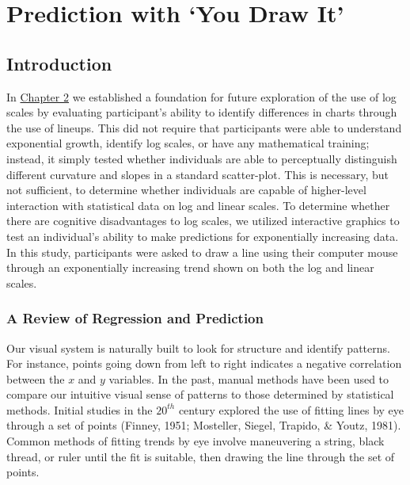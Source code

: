 \documentclass[print]{nuthesis}
\begin{document}
\hypertarget{youdrawit}{%
\chapter{Prediction with `You Draw It'}\label{youdrawit}}

\hypertarget{introduction-1}{%
\section{Introduction}\label{introduction-1}}

In \protect\hyperlink{lineups}{Chapter 2} we established a foundation for future exploration of the use of log scales by evaluating participant's ability to identify differences in charts through the use of lineups.
This did not require that participants were able to understand exponential growth, identify log scales, or have any mathematical training; instead, it simply tested whether individuals are able to perceptually distinguish different curvature and slopes in a standard scatter-plot.
This is necessary, but not sufficient, to determine whether individuals are capable of higher-level interaction with statistical data on log and linear scales.
To determine whether there are cognitive disadvantages to log scales, we utilized interactive graphics to test an individual's ability to make predictions for exponentially increasing data.
In this study, participants were asked to draw a line using their computer mouse through an exponentially increasing trend shown on both the log and linear scales.

\hypertarget{a-review-of-regression-and-prediction}{%
\subsection{A Review of Regression and Prediction}\label{a-review-of-regression-and-prediction}}

Our visual system is naturally built to look for structure and identify patterns.
For instance, points going down from left to right indicates a negative correlation between the \(x\) and \(y\) variables.
In the past, manual methods have been used to compare our intuitive visual sense of patterns to those determined by statistical methods.
Initial studies in the \(20^{th}\) century explored the use of fitting lines by eye through a set of points (Finney, 1951; Mosteller, Siegel, Trapido, \& Youtz, 1981).
Common methods of fitting trends by eye involve maneuvering a string, black thread, or ruler until the fit is suitable, then drawing the line through the set of points.
\end{document}
